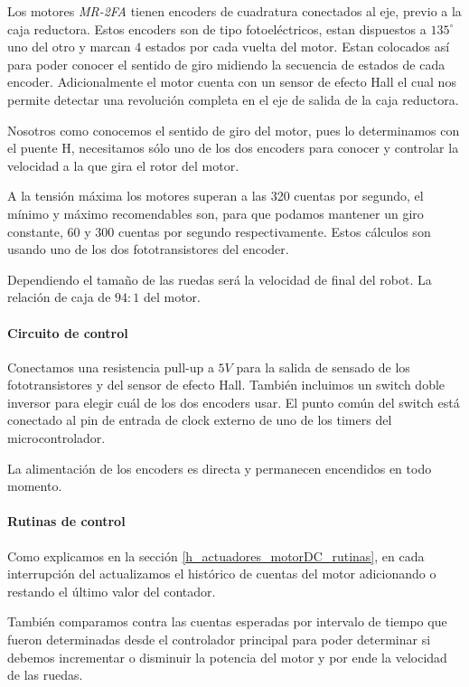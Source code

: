 Los motores \emph{MR-2FA} tienen encoders de cuadratura conectados al eje, previo a la caja reductora.
Estos encoders son de tipo fotoel\'ectricos, estan dispuestos a $135^{\circ}$ uno del otro y marcan $4$ estados por
cada vuelta del motor.
Estan colocados as\'i para poder conocer el sentido de giro midiendo la secuencia de estados de cada encoder.
Adicionalmente el motor cuenta con un sensor de efecto Hall el cual nos permite detectar una revoluci\'on completa
en el eje de salida de la caja reductora.

Nosotros como conocemos el sentido de giro del motor, pues lo determinamos con el puente H, necesitamos s\'olo
uno de los dos encoders para conocer y controlar la velocidad a la que gira el rotor del motor.

A la tensi\'on m\'axima los motores superan a las 320 cuentas por segundo, el m\'inimo y m\'aximo recomendables
son, para que podamos mantener un giro constante, $60$ y $300$ cuentas por segundo respectivamente.
Estos c\'alculos son usando uno de los dos fototransistores del encoder.

Dependiendo el tama\~no de las ruedas ser\'a la velocidad de final del robot.
La relaci\'on de caja de $94:1$ del motor.

\paragraph{Circuito de control}
\label{h_sensado_encoder_circuito}

Conectamos una resistencia pull-up a $5V$ para la salida de sensado de los fototransistores y del
sensor de efecto Hall.
Tambi\'en incluimos un switch doble inversor para elegir cu\'al de los dos encoders usar.
El punto com\'un del switch est\'a conectado al pin de entrada de clock externo de uno de los timers del
microcontrolador.

La alimentaci\'on de los encoders es directa y permanecen encendidos en todo momento.

\paragraph{Rutinas de control}
\label{h_sensado_encoder_rutinas}

Como explicamos en la secci\'on \ref{h_actuadores_motorDC_rutinas}, en cada interrupci\'on del actualizamos
el hist\'orico de cuentas del motor adicionando o restando el \'ultimo valor del contador.

Tambi\'en comparamos contra las cuentas esperadas por intervalo de tiempo que fueron determinadas desde el controlador
principal para poder determinar si debemos incrementar o disminuir la potencia del motor y por ende la velocidad de las ruedas.

